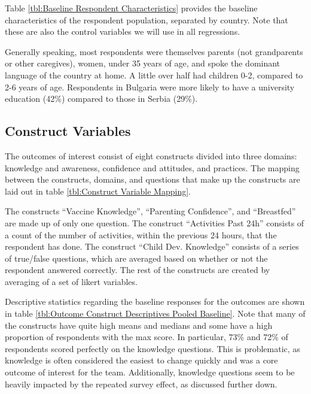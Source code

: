\documentclass{article}
\begin{document}
Table \ref{tbl:Baseline Respondent Characteristics} provides the baseline characteristics of the respondent population, separated by country. Note that these are also the control variables we will use in all regressions.

Generally speaking, most respondents were themselves parents (not grandparents or other caregives), women, under 35 years of age, and spoke the dominant language of the country at home. A little over half had children 0-2, compared to 2-6 years of age. Respondents in Bulgaria were more likely to have a university education (42\%) compared to those in Serbia (29\%).



\subsection*{Construct Variables}

The outcomes of interest consist of eight constructs divided into three domains: knowledge and awareness, confidence and attitudes, and practices. The mapping between the constructs, domains, and questions that make up the constructs are laid out in table \ref{tbl:Construct Variable Mapping}.

The constructs ``Vaccine Knowledge'', ``Parenting Confidence'', and ``Breastfed'' are made up of only one question. The construct ``Activities Past 24h'' consists of a count of the number of activities, within the previous 24 hours, that the respondent has done. The construct ``Child Dev. Knowledge'' consists of a series of true/false questions, which are averaged based on whether or not the respondent answered correctly. The rest of the constructs are created by averaging of a set of likert variables.

Descriptive statistics regarding the baseline responses for the outcomes are shown in table \ref{tbl:Outcome Construct Descriptives Pooled Baseline}. Note that many of the constructs have quite high means and medians and some have a high proportion of respondents with the max score. In particular, 73\% and 72\% of respondents scored perfectly on the knowledge questions. This is problematic, as knowledge is often considered the easiest to change quickly and was a core outcome of interest for the team. Additionally, knowledge questions seem to be heavily impacted by the repeated survey effect, as discussed further down.
\end{document}
